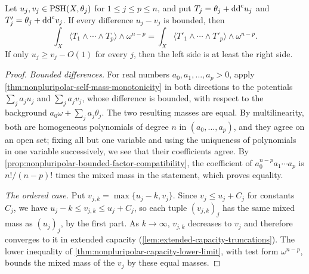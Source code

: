 \begin{corollary}\label{cor:nonpluripolar-bounded-type-mixed-mass}
Let $u_j,v_j\in\mathrm{PSH}(X,\theta_j)$ for $1\leq j\leq p\leq n$, and put $T_j=\theta_j+\mathrm{dd}^{\mathrm{c}} u_j$ and $T'_j=\theta_j+\mathrm{dd}^{\mathrm{c}} v_j$. If every difference $u_j-v_j$ is bounded, then
\[
 \int_X\langle T_1\wedge\cdots\wedge T_p\rangle\wedge\omega^{n-p}
 =\int_X\langle T'_1\wedge\cdots\wedge T'_p\rangle\wedge\omega^{n-p}.
\]
If only $u_j\geq v_j-O(1)$ for every $j$, then the left side is at least the right side.
\end{corollary}
\begin{proof}
\emph{Bounded differences.} For real numbers $a_0,a_1,\ldots,a_p>0$, apply \cref{thm:nonpluripolar-self-mass-monotonicity} in both directions to the potentials $\sum_ja_ju_j$ and $\sum_ja_jv_j$, whose difference is bounded, with respect to the background $a_0\omega+\sum_ja_j\theta_j$. The two resulting masses are equal. By multilinearity, both are homogeneous polynomials of degree $n$ in $(a_0,\ldots,a_p)$, and they agree on an open set; fixing all but one variable and using the uniqueness of polynomials in one variable successively, we see that their coefficients agree. By \cref{prop:nonpluripolar-bounded-factor-compatibility}, the coefficient of $a_0^{n-p}a_1\cdots a_p$ is $n!/(n-p)!$ times the mixed mass in the statement, which proves equality.

\emph{The ordered case.} Put $v_{j,k}=\max\{u_j-k,v_j\}$. Since $v_j\leq u_j+C_j$ for constants $C_j$, we have $u_j-k\leq v_{j,k}\leq u_j+C_j$, so each tuple $(v_{j,k})_j$ has the same mixed mass as $(u_j)_j$, by the first part. As $k\to\infty$, $v_{j,k}$ decreases to $v_j$ and therefore converges to it in extended capacity (\cref{lem:extended-capacity-truncations}). The lower inequality of \cref{thm:nonpluripolar-capacity-lower-limit}, with test form $\omega^{n-p}$, bounds the mixed mass of the $v_j$ by these equal masses.
\end{proof}

